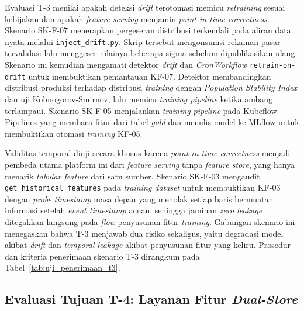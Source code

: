 Evaluasi T-3 menilai apakah deteksi \textit{drift} terotomasi memicu \textit{retraining} sesuai kebijakan dan apakah \textit{feature serving} menjamin \textit{point-in-time correctness}. Skenario SK-F-07 menerapkan pergeseran distribusi terkendali pada aliran data nyata melalui \texttt{inject\_drift.py}. Skrip tersebut mengonsumsi rekaman pasar tervalidasi lalu menggeser nilainya beberapa sigma sebelum dipublikasikan ulang. Skenario ini kemudian mengamati detektor \textit{drift} dan \textit{CronWorkflow} \texttt{retrain-on-drift} untuk membuktikan pemantauan KF-07. Detektor membandingkan distribusi produksi terhadap distribusi \textit{training} dengan \textit{Population Stability Index} dan uji Kolmogorov-Smirnov, lalu memicu \textit{training pipeline} ketika ambang terlampaui. Skenario SK-F-05 menjalankan \textit{training pipeline} pada Kubeflow Pipelines yang membaca fitur dari tabel \textit{gold} dan menulis model ke MLflow untuk membuktikan otomasi \textit{training} KF-05.

Validitas temporal diuji secara khusus karena \textit{point-in-time correctness} menjadi pembeda utama platform ini dari \textit{feature serving} tanpa \textit{feature store}, yang hanya menarik \textit{tabular feature} dari satu sumber. Skenario SK-F-03 mengaudit \texttt{get\_historical\_features} pada \textit{training dataset} untuk membuktikan KF-03 dengan \textit{probe} \textit{timestamp} masa depan yang menolak setiap baris bermuatan informasi setelah \textit{event timestamp} acuan, sehingga jaminan \textit{zero leakage} ditegakkan langsung pada \textit{flow} penyusunan fitur \textit{training}. Gabungan skenario ini menegaskan bahwa T-3 menjawab dua risiko sekaligus, yaitu degradasi model akibat \textit{drift} dan \textit{temporal leakage} akibat penyusunan fitur yang keliru. Prosedur dan kriteria penerimaan skenario T-3 dirangkum pada Tabel~\ref{tab:uji_penerimaan_t3}.



\subsection{Evaluasi Tujuan T-4: Layanan Fitur \textit{Dual-Store}}
\label{subsec:metode-t4}

